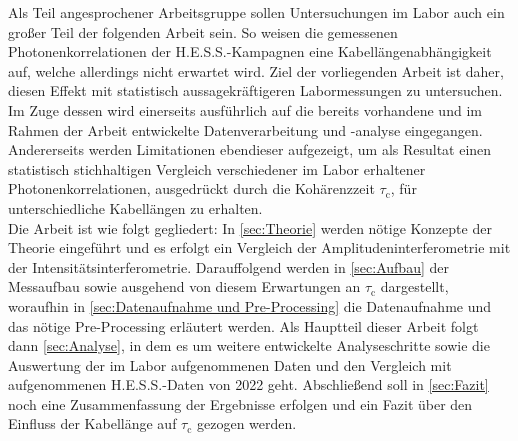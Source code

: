 Als Teil angesprochener Arbeitsgruppe sollen Untersuchungen im Labor auch ein großer Teil der folgenden Arbeit sein. 
So weisen die gemessenen Photonenkorrelationen der H.E.S.S.-Kampagnen eine Kabellängenabhängigkeit auf, welche allerdings nicht erwartet wird. 
Ziel der vorliegenden Arbeit ist daher, diesen Effekt mit statistisch aussagekräftigeren Labormessungen zu untersuchen. 
Im Zuge dessen wird einerseits ausführlich auf die bereits vorhandene und im Rahmen der Arbeit entwickelte Datenverarbeitung und -analyse eingegangen. 
Andererseits werden Limitationen ebendieser aufgezeigt, um als Resultat einen statistisch stichhaltigen Vergleich verschiedener im Labor erhaltener Photonenkorrelationen, ausgedrückt durch die Kohärenzzeit $\tau_\mathrm{c}$, für unterschiedliche Kabellängen zu erhalten. \\
Die Arbeit ist wie folgt gegliedert: 
In \autoref{sec:Theorie} werden nötige Konzepte der Theorie eingeführt und es erfolgt ein Vergleich der Amplitudeninterferometrie mit der Intensitätsinterferometrie. 
Darauffolgend werden in \autoref{sec:Aufbau} der Messaufbau sowie ausgehend von diesem Erwartungen an $\tau_{\mathrm{c}}$ dargestellt, woraufhin in \autoref{sec:Datenaufnahme und Pre-Processing} die Datenaufnahme und das nötige Pre-Processing erläutert werden. 
Als Hauptteil dieser Arbeit folgt dann \autoref{sec:Analyse}, in dem es um weitere entwickelte Analyseschritte sowie die Auswertung der im Labor aufgenommenen Daten und den Vergleich mit aufgenommenen H.E.S.S.-Daten von 2022 geht. 
Abschließend soll in \autoref{sec:Fazit} noch eine Zusammenfassung der Ergebnisse erfolgen und ein Fazit über den Einfluss der Kabellänge auf $\tau_{\mathrm{c}}$ gezogen werden.